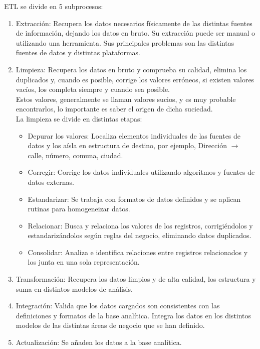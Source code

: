 ETL se divide en 5 subprocesos:

\begin{enumerate}
\item Extracción:
Recupera los datos necesarios físicamente de las distintas fuentes de información, dejando los datos en bruto. Su extracción puede ser manual o utilizando una herramienta. Sus principales problemas son las distintas fuentes de datos y distintas plataformas.

\item Limpieza:
Recupera los datos en bruto y comprueba su calidad, elimina los duplicados y, cuando es posible, corrige los valores erróneos, si existen valores vacíos, los completa siempre y cuando sea posible.\\

Estos valores, generalmente se llaman valores sucios, y es muy probable encontrarlos, lo importante es saber el origen de dicha suciedad.\\

La limpieza se divide en distintas etapas:
\begin{itemize}
    \item Depurar los valores:
    Localiza elementos individuales de las fuentes de datos y los aísla en estructura de destino, por ejemplo, Dirección $\rightarrow $ calle, número, comuna, ciudad.
    
    \item Corregir:
    Corrige los datos individuales utilizando algoritmos y fuentes de datos externas.
    
    \item Estandarizar:
    Se trabaja con formatos de datos definidos y se aplican rutinas para homogeneizar datos. 
    
    \item Relacionar:
    Busca y relaciona los valores de los registros, corrigiéndolos y estandarizándolos según reglas del negocio, eliminando datos duplicados.
    
    \item Consolidar: 
    Analiza e identifica relaciones entre registros relacionados y los junta en una sola representación.

\end{itemize}

\item Transformación:
Recupera los datos limpios y de alta calidad, los estructura y suma en distintos modelos de análisis.

\item Integración:
Valida que los datos cargados son consistentes con las definiciones y formatos de la base analítica. Integra los datos en los distintos modelos de las distintas áreas de negocio que se han definido.

\item Actualización:
Se añaden los datos a la base analítica.


\end{enumerate}


